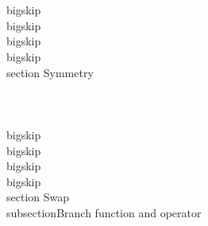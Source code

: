 \\[, i \\nPe j, \\Or, \\Rq , \\Or,\\]



\\bigskip
\\bigskip
\\bigskip
\\bigskip
\\section{ Symmetry}
\\[, \\Bls{if(i \\Pe j)}{,}{,} \\Rq , \\Bls{if(j \\Pe i)}{,}{,} \\]

\\[, i \\Pe j, \\Rq , j \\Pe i,\\]
\\[, i \\nPe j, \\Rq , j \\nPe i,\\]


\\bigskip
\\bigskip
\\bigskip
\\bigskip
\\section{ Swap}
\\subsection{Branch function and operator}
\\[,\\Ot m, \\Blb{if(i \\Pe j)}{,}{,} \\Rq , \\Blb{if(i \\Pe j)}{,\\Ot m,}{,\\Ot m,}\\]

\\[,\\Og m, \\Blb{if(i \\Pe j)}{,}{,} \\Rq , \\Blb{if(i \\Pe j)}{,\\Og m,}{,\\Og m,}\\]

